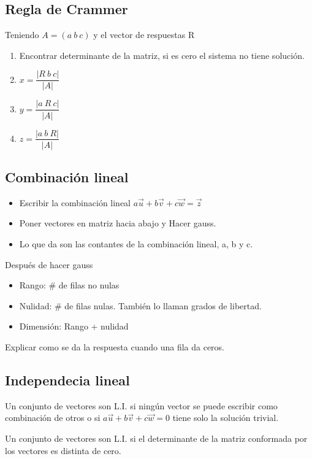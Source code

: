 \subsection{Regla de Crammer}
Teniendo $A=(a\ b\ c)$ y el vector de respuestas R
\begin{enumerate}
	\item Encontrar determinante de la matriz, si es cero el sistema no tiene solución.
	\item $x=\dfrac{|R\  b\  c|}{|A|}$
	\item $y=\dfrac{|a\  R\  c|}{|A|}$
	\item $z=\dfrac{|a\  b\  R|}{|A|}$
\end{enumerate}

\subsection{Combinación lineal}

\begin{itemize}
	\item Escribir la combinación lineal $a\overrightarrow{u}+b\overrightarrow{v}+c\overrightarrow{w}=\overrightarrow{z}$
	\item Poner vectores en matriz hacia abajo y Hacer gauss.
	\item Lo que da son las contantes de la combinación lineal, a, b y c.
\end{itemize}

Después de hacer gauss
\begin{itemize}
	\item Rango: $\#$ de filas no nulas
	\item Nulidad: $\#$ de filas nulas. También lo llaman grados de libertad.
	\item Dimensión: Rango + nulidad
\end{itemize}

Explicar como se da la respuesta cuando una fila da ceros.

\subsection{Independecia lineal}

Un conjunto de vectores son L.I. si ningún vector se puede escribir como combinación de otros o si  $a\overrightarrow{u}+b\overrightarrow{v}+c\overrightarrow{w}=0$ tiene solo la solución trivial.

Un conjunto de vectores son L.I. si el determinante de la matriz conformada por los vectores es distinta de cero.

